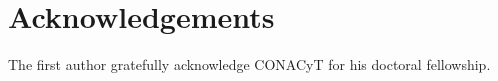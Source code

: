 \documentclass[number,preprint,review,12pt]{elsarticle}
\begin{document}
\section{Acknowledgements}
	The first author gratefully acknowledge CONACyT for his doctoral fellowship.
\newpage 
{}

\end{document}
